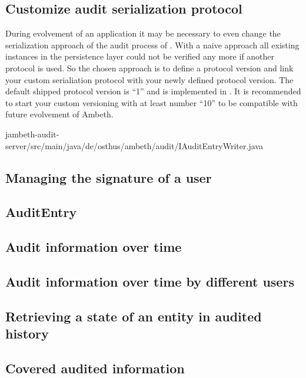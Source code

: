 \subsection{Customize audit serialization protocol}
During evolvement of an application it may be necessary to even change the serialization approach of the audit process of . With a naive approach all existing  instances in the persistence layer could not be verified any more if another protocol is used. So the chosen approach is to define a protocol version and link your custom serialiation protocol with your newly defined protocol version. The default shipped protocol version is ``1'' and is implemented in . It is recommended to start your custom versioning with at least number ``10'' to be compatible with future evolvement of Ambeth.

	{jambeth-audit-server/src/main/java/de/osthus/ambeth/audit/IAuditEntryWriter.java}
		
\subsection{Managing the signature of a user}
\TODO

\subsection{AuditEntry}
\TODO

\subsection{Audit information over time}
\TODO

\subsection{Audit information over time by different users}
\TODO

\subsection{Retrieving a state of an entity in audited history}
\TODO

\subsection{Covered audited information}
\TODO